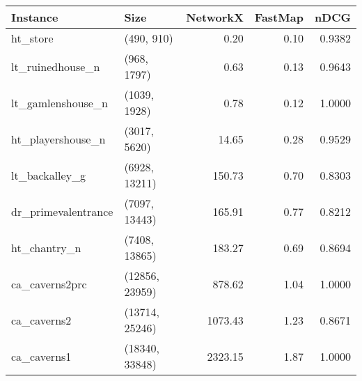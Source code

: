 \begin{tabular}{llrrr}
\toprule
           Instance &           Size &  NetworkX &  FastMap &   nDCG \\
\midrule
           ht\_store &     (490, 910) &      0.20 &     0.10 & 0.9382 \\
   lt\_ruinedhouse\_n &    (968, 1797) &      0.63 &     0.13 & 0.9643 \\
  lt\_gamlenshouse\_n &   (1039, 1928) &      0.78 &     0.12 & 1.0000 \\
  ht\_playershouse\_n &   (3017, 5620) &     14.65 &     0.28 & 0.9529 \\
     lt\_backalley\_g &  (6928, 13211) &    150.73 &     0.70 & 0.8303 \\
dr\_primevalentrance &  (7097, 13443) &    165.91 &     0.77 & 0.8212 \\
       ht\_chantry\_n &  (7408, 13865) &    183.27 &     0.69 & 0.8694 \\
     ca\_caverns2prc & (12856, 23959) &    878.62 &     1.04 & 1.0000 \\
        ca\_caverns2 & (13714, 25246) &   1073.43 &     1.23 & 0.8671 \\
        ca\_caverns1 & (18340, 33848) &   2323.15 &     1.87 & 1.0000 \\
\bottomrule
\end{tabular}
